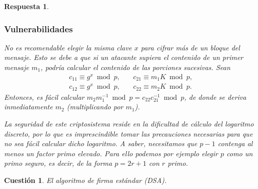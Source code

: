 \documentclass[
  a4paper,
  spanish,
  12pt,
]{scrartcl}
\theoremstyle{ejercicio-style}
\newtheorem{ejer}{Cuestión}
\theoremstyle{remark-style}
\newtheorem*{sol}{Respuesta}
\theoremstyle{teorema-style}
\begin{document}
\begin{sol}
\subsubsection*{Vulnerabilidades}

No es recomendable elegir la misma clave $x$ para cifrar más de un bloque del mensaje. Esto se debe a que si un atacante supiera el contenido de un primer mensaje \(m_{1}\), podría calcular el contenido de las porciones sucesivas. Sean
\begin{align*}
c_{11}\equiv g^x \bmod{p}, \quad& c_{21}\equiv m_{1}K\bmod{p}, \\
c_{12}\equiv g^x \bmod{p}, \quad& c_{22}\equiv m_{2}K\bmod{p}.
\end{align*}
Entonces, es fácil calcular \(m_2m_1^{-1} \bmod p = c_{22}c_{21}^{-1} \bmod{p}\), de donde se deriva inmediatamente \(m_{2}\) (multiplicando por \(m_{1}\)).

La seguridad de este criptosistema reside en la dificultad de cálculo del logaritmo discreto, por lo que es imprescindible tomar las precauciones necesarias para que no sea fácil calcular dicho logaritmo. A saber, necesitamos que $p-1$ contenga al menos un factor primo elevado. Para ello podemos por ejemplo elegir $p$ como un \textit{primo seguro}, es decir, de la forma $p = 2r + 1$ con $r$ primo.
\end{sol}

\begin{ejer}
  El algoritmo de firma estándar (DSA).
  \label{q:8}
\end{ejer}
\end{document}
